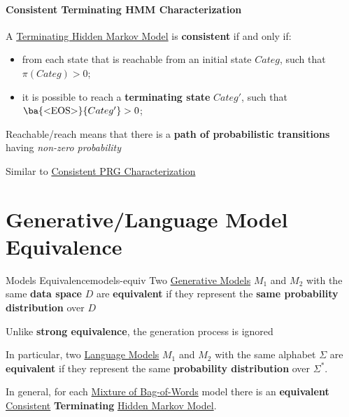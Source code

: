 \paragraph{Consistent Terminating HMM Characterization}\label{par:lm_consistent_terminating_hmm_characterization} %
A \hyperref[sub:lm_terminating_hidden_markov_models]{Terminating Hidden Markov Model} is \textbf{consistent} if and only if:
\begin{itemize}
    \item from each state that is reachable from an initial state $Categ$, such that $\pi(Categ) > 0$;
    \item it is possible to reach a \textbf{terminating state} $Categ'$, such that $\ba{\text{<EOS>}}{Categ'} > 0$;
\end{itemize}
\begin{note}
    Reachable/reach means that there is a \textbf{path of probabilistic transitions} having \textit{non-zero probability}
\end{note}
\begin{tip}
    Similar to \hyperref[sub:lm_consistent_prg_characterization]{Consistent PRG Characterization}
\end{tip}
%
\section{Generative/Language Model Equivalence}\label{sec:lm_generative_language_model_equivalence} %
\begin{definition}{Models Equivalence}{models-equiv}
    Two \hyperref[def:generative-model]{Generative Models} $M_1$ and $M_2$ with the same \textbf{data space} $D$ are \textbf{equivalent} if they represent the \textbf{same probability distribution} over $D$
    \begin{note}
        Unlike \textbf{strong equivalence}, the generation process is ignored
    \end{note}
    In particular, two \hyperref[acro:lm]{Language Models} $M_1$ and $M_2$ with the same alphabet $\Sigma$ are \textbf{equivalent} if they represent the same \textbf{probability distribution} over $\Sigma^*$.
\end{definition}
In general, for each \hyperref[sub:lm_mixture_of_bag_of_words]{Mixture of Bag-of-Words} model there is an \textbf{equivalent} \hyperref[def:pg-consistent]{Consistent} \textbf{Terminating} \hyperref[def:hmm]{Hidden Markov Model}.
\begin{warning}
\end{warning}
%
